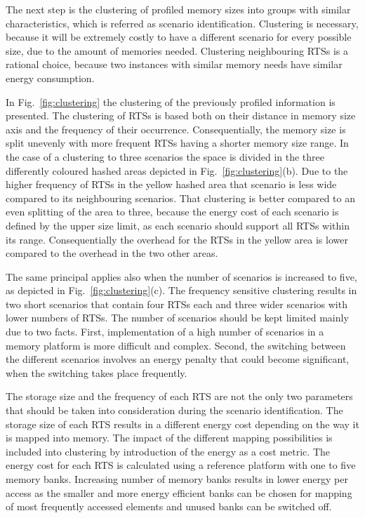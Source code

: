\documentclass[a4paper,conference]{IEEEtran}
\begin{document}
The next step is the clustering of profiled memory sizes into groups with similar characteristics, which is referred as scenario identification. Clustering is necessary, because it will be extremely costly to have a different scenario for every possible size, due to the amount of memories needed. Clustering neighbouring RTSs is a rational choice, because two instances with similar memory needs have similar energy consumption. 

In Fig.~\ref{fig:clustering} the clustering of the previously profiled information is presented. The clustering of RTSs is based both on their distance in memory size axis and the frequency of their occurrence. Consequentially, the memory size is split unevenly with more frequent RTSs having a shorter memory size range. In the case of a clustering to three scenarios the space is divided in the three differently coloured hashed areas depicted in Fig.~\ref{fig:clustering}(b). Due to the higher frequency of RTSs in the yellow hashed area that scenario is less wide compared to its neighbouring scenarios. That clustering is better compared to an even splitting of the area to three, because the energy cost of each scenario is defined by the upper size limit, as each scenario should support all RTSs within its range. Consequentially the overhead for the RTSs in the yellow area is lower compared to the overhead in the two other areas.

The same principal applies also when the number of scenarios is increased to five, as depicted in Fig.~\ref{fig:clustering}(c). The frequency sensitive clustering results in two short scenarios that contain four RTSs each and three wider scenarios with lower numbers of RTSs. The number of scenarios should be kept limited mainly due to two facts. First, implementation of a high number of scenarios in a memory platform is more difficult and complex. Second, the switching between the different scenarios involves an energy penalty that could become significant, when the switching takes place frequently.

The storage size and the frequency of each RTS are not the only two parameters that should be taken into consideration during the scenario identification. The storage size of each RTS results in a different energy cost depending on the way it is mapped into memory. The impact of the different mapping possibilities is included into clustering by introduction of the energy as a cost metric. The energy cost for each RTS is calculated using a reference platform with one to five memory banks. Increasing number of memory banks results in lower energy per access as the smaller and more energy efficient banks can be chosen for mapping of most frequently accessed elements and unused banks can be switched off.
\end{document}
